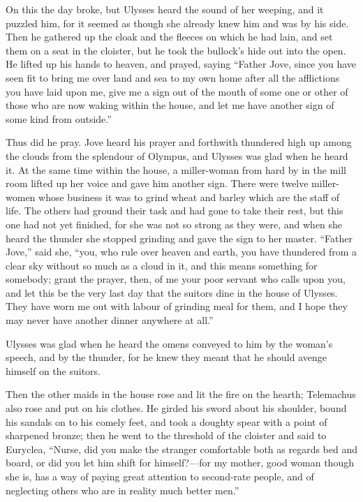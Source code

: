 On this the day broke, but Ulysses heard the sound of her weeping, and it
puzzled him, for it seemed as though she already knew him and was by his side.
Then he gathered up the cloak and the fleeces on which he had lain, and set
them on a seat in the cloister, but he took the bullock’s hide out into the
open. He lifted up his hands to heaven, and prayed, saying “Father Jove, since
you have seen fit to bring me over land and sea to my own home after all the
afflictions you have laid upon me, give me a sign out of the mouth of some one
or other of those who are now waking within the house, and let me have another
sign of some kind from outside.”

Thus did he pray. Jove heard his prayer and forthwith thundered high up among
the clouds from the splendour of Olympus, and Ulysses was glad when he heard
it. At the same time within the house, a miller-woman from hard by in the mill
room lifted up her voice and gave him another sign. There were twelve
miller-women whose business it was to grind wheat and barley which are the
staff of life. The others had ground their task and had gone to take their
rest, but this one had not yet finished, for she was not so strong as they
were, and when she heard the thunder she stopped grinding and gave the sign to
her master. “Father Jove,” said she, “you, who rule over heaven and earth, you
have thundered from a clear sky without so much as a cloud in it, and this
means something for somebody; grant the prayer, then, of me your poor servant
who calls upon you, and let this be the very last day that the suitors dine in
the house of Ulysses. They have worn me out with labour of grinding meal for
them, and I hope they may never have another dinner anywhere at all.”

Ulysses was glad when he heard the omens conveyed to him by the woman’s speech,
and by the thunder, for he knew they meant that he should avenge himself on the
suitors.

Then the other maids in the house rose and lit the fire on the hearth;
Telemachus also rose and put on his clothes. He girded his sword about his
shoulder, bound his sandals on to his comely feet, and took a doughty spear
with a point of sharpened bronze; then he went to the threshold of the cloister
and said to Euryclea, “Nurse, did you make the stranger comfortable both as
regards bed and board, or did you let him shift for himself?—for my mother,
good woman though she is, has a way of paying great attention to second-rate
people, and of neglecting others who are in reality much better men.”

